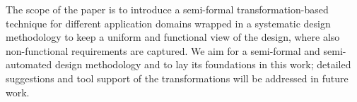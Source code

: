 


The scope of the paper is to introduce a semi-formal transformation-based technique for different application domains wrapped in a systematic design methodology to keep a uniform and functional view of the design, where also non-functional requirements are captured.
We aim for a semi-formal and semi-automated design methodology and to lay its foundations in this work; detailed suggestions and tool support  of the transformations will be addressed in future work. 

